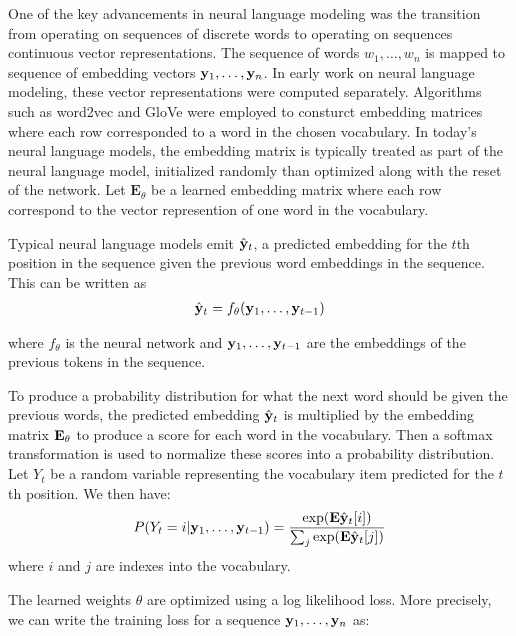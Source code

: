 One of the key advancements in neural language modeling was the transition from operating on sequences of discrete words to operating on sequences continuous vector representations.
The sequence of words $w_1, \ldots, w_n$ is mapped to sequence of embedding vectors $\mathbf{y}_1, \ldots, \mathbf{y}_n$.
In early work on neural language modeling, these vector representations were computed separately.
Algorithms such as word2vec \citep{mikolov2013word2vec} and GloVe \citep{pennington2014glove} were employed to consturct embedding matrices where each row corresponded to a word in the chosen vocabulary.
In today's neural language models, the embedding matrix is typically treated as part of the neural language model, initialized randomly than optimized along with the reset of the network.
Let $\mathbf{E}_\theta$ be a learned embedding matrix where each row correspond to the vector represention of one word in the vocabulary.

Typical neural language models emit $\hat{\mathbf{y}}_t$, a predicted embedding for the $t$th position in the sequence given the previous word embeddings in the sequence. This can be written as
\begin{align}
    \hat{\mathbf{y}}_t = f_\theta(\mathbf{y}_1, \ldots, \mathbf{y}_{t-1})
    \label{eq:lm_feq}
\end{align}

where $f_\theta$ is the neural network and $\mathbf{y}_1, \ldots, \mathbf{y}_{t-1}$ are the embeddings of the previous tokens in the sequence.

To produce a probability distribution for what the next word should be given the previous words, the predicted embedding $\hat{\mathbf{y}}_t$ is multiplied by the embedding matrix $\mathbf{E}_\theta$ to produce a score for each word in the vocabulary.
Then a softmax transformation is used to normalize these scores into a probability distribution.
Let $Y_t$ be a random variable representing the vocabulary item predicted for the $t$th position. We then have:
\begin{align}
    \label{equation:vocab}
    P(Y_t=i | \mathbf{y}_1, \ldots, \mathbf{y}_{t-1}) = \frac{\exp(\mathbf{E}\hat{\mathbf{y}}_t[i])}{\sum_j\exp(\mathbf{E}\hat{\mathbf{y}}_t[j])}
\end{align}
where $i$ and $j$ are indexes into the vocabulary.

The learned weights $\theta$ are optimized using a log likelihood loss.
More precisely, we can write the training loss for a sequence $\mathbf{y}_1, \ldots, \mathbf{y}_n$ as:


